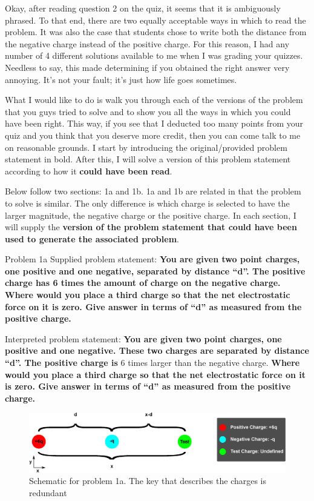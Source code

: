 \begin{homeworkProblem}
Okay, after reading question 2 on the quiz, it seems that it is ambiguously phrased. To that end, there are two equally acceptable ways in which to read the problem. It was also the case that students chose to write both the distance from the negative charge instead of the positive charge. For this reason, I had any number of 4 different solutions available to me when I was grading your quizzes. Needless to say, this made determining if you obtained the right answer very annoying. It's not your fault; it's just how life goes sometimes.


What I would like to do is walk you through each of the versions of the problem that you guys tried to solve and to show you all the ways in which you could have been right. This way, if you see that I deducted too many points from your quiz and you think that you deserve more credit, then you can come talk to me on reasonable grounds. I start by introducing the original/provided problem statement in bold. After this, I will solve a version of this problem statement according to how it \textbf{could have been read}.


Below follow two sections: 1a and 1b. 1a and 1b are related in that the problem to solve is similar. The only difference is which charge is selected to have the larger magnitude, the negative charge or the positive charge. In each section, I will supply the \textbf{version of the problem statement that could have been used to generate the associated problem}.

\begin{homeworkSection}{Problem 1a}
Supplied problem statement: \textbf{You are given two point charges, one positive and one negative, separated by distance  ``d''. The positive charge has 6 times the amount of charge on the negative charge. Where would you place a third charge so that the net electrostatic force on it is zero. Give answer in terms of ``d'' as measured from the positive charge.}


Interpreted problem statement: \textbf{You are given two point charges, one positive and one negative. These two charges are separated by distance ``d''. The positive charge is} 6 times larger than the negative charge. \textbf{Where would you place a third charge so that the net electrostatic force on it is zero. Give answer in terms of ``d'' as measured from the positive charge.}

\begin{figure}%
\centering
\includegraphics[width=\columnwidth]{1a.eps}%
\caption{Schematic for problem 1a. The key that describes the charges is redundant}%
\label{fig:1a}%
\end{figure}


\end{homeworkSection}
\end{homeworkProblem}
